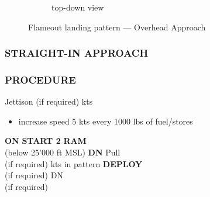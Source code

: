 \begin{figure}[htbp]
\begin{subfigure}[t]{\linewidth}
        \caption{top-down view}
    \end{subfigure}
    \caption{Flameout landing pattern --- Overhead Approach}
    \label{fig:proc_em:landing:flameout:overhead}
\end{figure}

\clearpage

\subsubsection{STRAIGHT-IN APPROACH}

\marginfigeometry

\subsubsection{PROCEDURE}

\begin{checklistenumerate}
    \blueitem[Stores]\dotfill Jettison (if required)
    \blueitem[Airspeed] kts
    \begin{itemize}
        \item increase speed 5 kts every 1000 lbs of fuel/stores
    \end{itemize}
    \blueitem[EPU]\dotfill \textbf{ON}
    \dotfill \textbf{START 2}
    \dotfill \textbf{RAM}\\
    \hfill(below 25'000 ft MSL)
    \blueitem[LG Handle]\dotfill \textbf{DN}
    \dotfill Pull\\
    \hfill(if required)
    \blueitem[Airspeed] kts in pattern
    \dotfill \textbf{DEPLOY}\\
    \hfill(if required)
    \dotfill DN\\
    \hfill(if required)
\end{checklistenumerate}

\clearpage

\marginfigrestore
